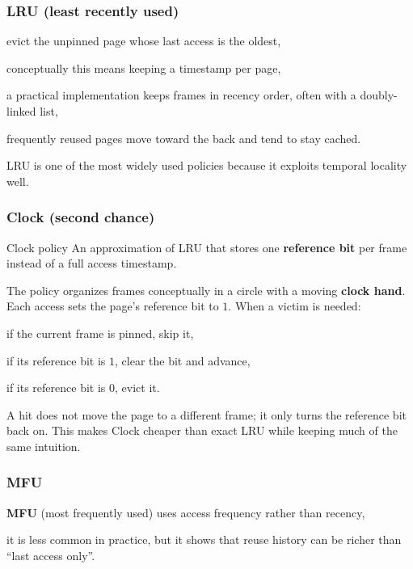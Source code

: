 \documentclass[../../dis.tex]{subfiles}
\begin{document}
\subsubsection*{LRU (least recently used)}
\begin{dashlist}
    \item evict the unpinned page whose last access is the oldest,
    \item conceptually this means keeping a timestamp per page,
    \item a practical implementation keeps frames in recency order, often with a doubly-linked list,
    \item frequently reused pages move toward the back and tend to stay cached.
\end{dashlist}

LRU is one of the most widely used policies because it exploits temporal locality well.
\newpage 
\subsubsection*{Clock (second chance)}
\begin{concept}{Clock policy}
An approximation of LRU that stores one \textbf{reference bit} per frame instead of a full access timestamp.
\end{concept}

The policy organizes frames conceptually in a circle with a moving \textbf{clock hand}. Each access sets the page's reference bit to \(1\). When a victim is needed:
\begin{dashlist}
    \item if the current frame is pinned, skip it,
    \item if its reference bit is \(1\), clear the bit and advance,
    \item if its reference bit is \(0\), evict it.
\end{dashlist}

A hit does not move the page to a different frame; it only turns the reference bit back on. This makes Clock cheaper than exact LRU while keeping much of the same intuition.

\begin{schema}
{}\par}
\end{schema}

\subsubsection*{MFU}
\begin{dashlist}
    \item \textbf{MFU} (most frequently used) uses access frequency rather than recency,
    \item it is less common in practice, but it shows that reuse history can be richer than ``last access only''.
\end{dashlist}
\end{document}
